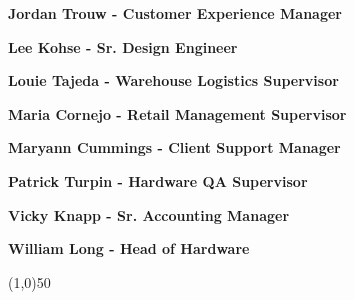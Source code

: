 \documentclass{article}
\begin{document}
\begin {framed}
\begin {center}
\textbf{Jordan Trouw - Customer Experience Manager}
\end {center}
\end {framed}

\begin {framed}
\begin {center}
\textbf{Lee Kohse - Sr. Design Engineer}
\end {center}
\end {framed}

\begin {framed}
\begin {center}
\textbf{Louie Tajeda - Warehouse Logistics Supervisor}
\end {center}
\end {framed}


\begin {framed}
\begin {center}
\textbf{Maria Cornejo - Retail Management Supervisor}
\end {center}
\end {framed}

\begin {framed}
\begin {center}
\textbf{Maryann Cummings - Client Support Manager}
\end {center}
\end {framed}

\begin {framed}
\begin {center}
\textbf{Patrick Turpin - Hardware QA Supervisor}
\end {center}
\end {framed}

\begin {framed}
\begin {center}
\textbf{Vicky Knapp - Sr. Accounting Manager}
\end {center}
\end {framed}

\begin {framed}
\begin {center}
\textbf{William Long - Head of Hardware}
\end {center}
\end {framed}

\begin{center}
\line(1,0){50}
\end{center}
\end{document}
